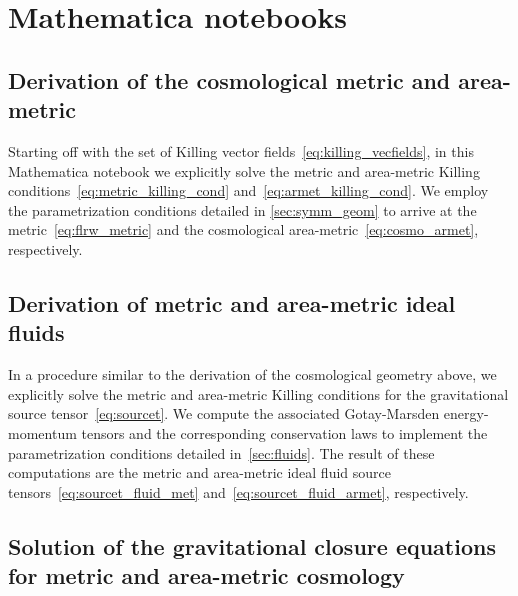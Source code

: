 \chapter{Mathematica notebooks}

\section{Derivation of the cosmological metric and area-metric}\label{nb:cosmo_geom}


Starting off with the set of Killing vector fields~\eqref{eq:killing_vecfields}, in this Mathematica notebook we explicitly solve the metric and area-metric Killing conditions~\eqref{eq:metric_killing_cond} and~\eqref{eq:armet_killing_cond}. We employ the parametrization conditions detailed in \autoref{sec:symm_geom} to arrive at the \FLRW{} metric~\eqref{eq:flrw_metric} and the cosmological area-metric~\eqref{eq:cosmo_armet}, respectively.

\section{Derivation of metric and area-metric ideal fluids}\label{nb:cosmo_em}


In a procedure similar to the derivation of the cosmological geometry above, we explicitly solve the metric and area-metric Killing conditions for the gravitational source tensor~\eqref{eq:sourcet}. We compute the associated Gotay-Marsden energy-momentum tensors and the corresponding conservation laws to implement the parametrization conditions detailed in~\autoref{sec:fluids}. The result of these computations are the metric and area-metric ideal fluid source tensors~\eqref{eq:sourcet_fluid_met} and~\eqref{eq:sourcet_fluid_armet}, respectively.

\section{Solution of the gravitational closure equations for metric and area-metric cosmology}\label{nb:constr_cosmo}



